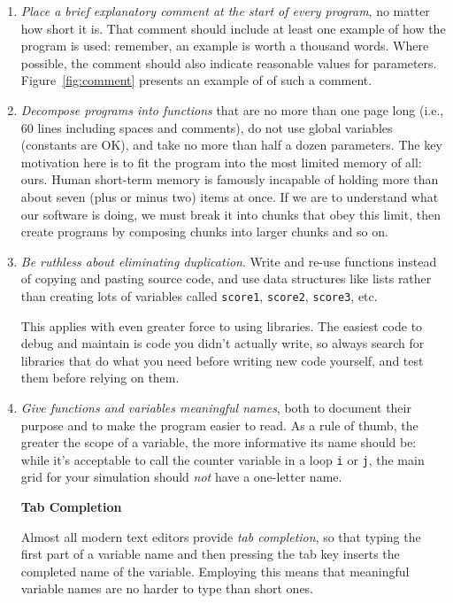 \documentclass[10pt]{article}
\newcommand{\recommend}[1]{\textit{#1}}
\begin{document}
\begin{enumerate}

\item  
  \recommend{Place a brief explanatory comment at the start of
    every program}, no matter how short it is. That comment should
  include at least one example of how the program is used: remember, an
  example is worth a thousand words. Where possible, the comment should
  also indicate reasonable values for parameters.  Figure~\ref{fig:comment}
  presents an example of of such a comment.

\item
  \recommend{Decompose programs into functions} that
  are no more than one page long (i.e., 60 lines including spaces and comments),
  do not use global variables (constants are OK),
  and take no more than half a dozen parameters.
  The key motivation here is to fit the program into the most limited
  memory of all: ours. Human short-term memory is famously incapable of
  holding more than about seven (plus or minus two) items at once. If we
  are to understand what our software is doing, we must break it into
  chunks that obey this limit, then create programs by composing chunks
  into larger chunks and so on.

\item
  \recommend{Be ruthless about eliminating duplication}. Write and
  re-use functions instead of copying and pasting source code, and use
  data structures like lists rather than creating lots of variables called
  \texttt{score1}, \texttt{score2}, \texttt{score3}, etc.

  This applies with even greater force to using libraries. The easiest code
  to debug and maintain is code you didn't actually write, so
  always search for libraries that do what you need before writing
  new code yourself, and test them before relying on them.

\item
  \recommend{Give functions and variables meaningful names}, both to
  document their purpose and to make the program easier to read. As a rule
  of thumb, the greater the scope of a variable, the more informative its
  name should be: while it's acceptable to call the counter variable in a
  loop \texttt{i} or \texttt{j}, the main grid for your simulation should
  \emph{not} have a one-letter name.

  \begin{framed}
    \noindent \textbf{Tab Completion}

    Almost all modern text editors provide \emph{tab completion},
    so that typing the first part of a variable name and then pressing the tab key
    inserts the completed name of the variable.
    Employing this means that meaningful variable names are no harder to type than short ones.


\end{framed}
\end{enumerate}
\end{document}
